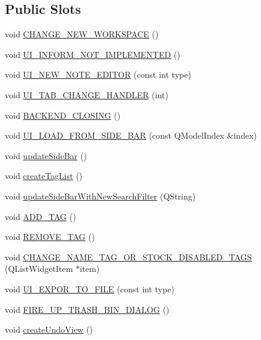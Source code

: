 \subsection*{Public Slots}
\begin{DoxyCompactItemize}
\item 
void \hyperlink{class_main_window_a08dcff12922f9432510f38ef8eaf992d}{C\-H\-A\-N\-G\-E\-\_\-\-N\-E\-W\-\_\-\-W\-O\-R\-K\-S\-P\-A\-C\-E} ()
\item 
void \hyperlink{class_main_window_a42324a619b842e0f398110dd8e236859}{U\-I\-\_\-\-I\-N\-F\-O\-R\-M\-\_\-\-N\-O\-T\-\_\-\-I\-M\-P\-L\-E\-M\-E\-N\-T\-E\-D} ()
\item 
void \hyperlink{class_main_window_ab5a596af6266e9637b89fb24241091f3}{U\-I\-\_\-\-N\-E\-W\-\_\-\-N\-O\-T\-E\-\_\-\-E\-D\-I\-T\-O\-R} (const int type)
\item 
void \hyperlink{class_main_window_a67eab781aa72d90315e11c0710d226c8}{U\-I\-\_\-\-T\-A\-B\-\_\-\-C\-H\-A\-N\-G\-E\-\_\-\-H\-A\-N\-D\-L\-E\-R} (int)
\item 
void \hyperlink{class_main_window_a6cb5b36e8a0b9a8a54a2891091bcf00a}{B\-A\-C\-K\-E\-N\-D\-\_\-\-C\-L\-O\-S\-I\-N\-G} ()
\item 
void \hyperlink{class_main_window_a780415d373aa12edc0785a6561fb6275}{U\-I\-\_\-\-L\-O\-A\-D\-\_\-\-F\-R\-O\-M\-\_\-\-S\-I\-D\-E\-\_\-\-B\-A\-R} (const Q\-Model\-Index \&index)
\item 
void \hyperlink{class_main_window_a2ee94c8bf65981f8461680a0447fbb92}{update\-Side\-Bar} ()
\item 
void \hyperlink{class_main_window_adcfa5523a25f8494baed4161fd1e45a6}{create\-Tag\-List} ()
\item 
void \hyperlink{class_main_window_a66e73c10b900d0a3f2920d7d7ecb2af0}{update\-Side\-Bar\-With\-New\-Search\-Filter} (Q\-String)
\item 
void \hyperlink{class_main_window_a658e60f235c67ee76e749df752594b09}{A\-D\-D\-\_\-\-T\-A\-G} ()
\item 
void \hyperlink{class_main_window_a858dcaf6301c4fbd4db2488f276b42f2}{R\-E\-M\-O\-V\-E\-\_\-\-T\-A\-G} ()
\item 
void \hyperlink{class_main_window_a18623c7fef243875defc32a76262224f}{C\-H\-A\-N\-G\-E\-\_\-\-N\-A\-M\-E\-\_\-\-T\-A\-G\-\_\-\-O\-R\-\_\-\-S\-T\-O\-C\-K\-\_\-\-D\-I\-S\-A\-B\-L\-E\-D\-\_\-\-T\-A\-G\-S} (Q\-List\-Widget\-Item $\ast$item)
\item 
void \hyperlink{class_main_window_a30a526e2cb4640937626178a717949ef}{U\-I\-\_\-\-E\-X\-P\-O\-R\-\_\-\-T\-O\-\_\-\-F\-I\-L\-E} (const int type)
\item 
void \hyperlink{class_main_window_a5781e7e8da2ec6664567c81fe31daa24}{F\-I\-R\-E\-\_\-\-U\-P\-\_\-\-T\-R\-A\-S\-H\-\_\-\-B\-I\-N\-\_\-\-D\-I\-A\-L\-O\-G} ()
\item 
void \hyperlink{class_main_window_a35595c4d04d1d8e29ae8c9460b2caea5}{create\-Undo\-View} ()
\end{DoxyCompactItemize}
